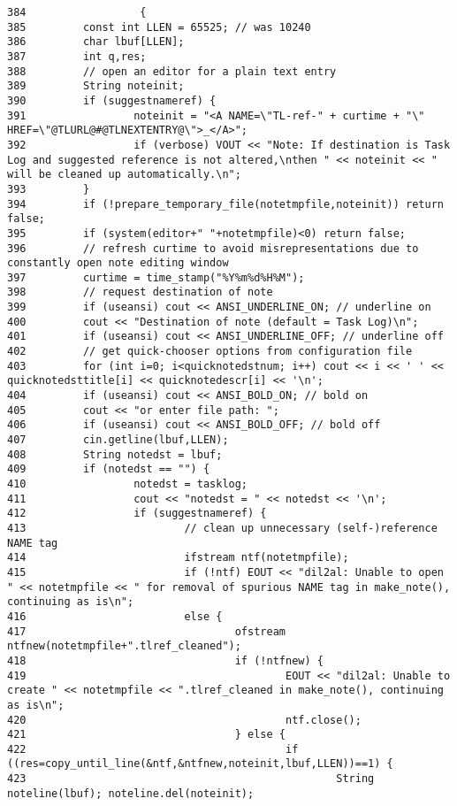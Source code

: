 \footnotesize\begin{verbatim}384                  {
385         const int LLEN = 65525; // was 10240
386         char lbuf[LLEN];
387         int q,res;
388         // open an editor for a plain text entry
389         String noteinit;
390         if (suggestnameref) {
391                 noteinit = "<A NAME=\"TL-ref-" + curtime + "\" HREF=\"@TLURL@#@TLNEXTENTRY@\">_</A>";
392                 if (verbose) VOUT << "Note: If destination is Task Log and suggested reference is not altered,\nthen " << noteinit << " will be cleaned up automatically.\n";
393         }
394         if (!prepare_temporary_file(notetmpfile,noteinit)) return false;
395         if (system(editor+" "+notetmpfile)<0) return false;
396         // refresh curtime to avoid misrepresentations due to constantly open note editing window
397         curtime = time_stamp("%Y%m%d%H%M");
398         // request destination of note
399         if (useansi) cout << ANSI_UNDERLINE_ON; // underline on
400         cout << "Destination of note (default = Task Log)\n";
401         if (useansi) cout << ANSI_UNDERLINE_OFF; // underline off
402         // get quick-chooser options from configuration file
403         for (int i=0; i<quicknotedstnum; i++) cout << i << ' ' << quicknotedsttitle[i] << quicknotedescr[i] << '\n';
404         if (useansi) cout << ANSI_BOLD_ON; // bold on
405         cout << "or enter file path: ";
406         if (useansi) cout << ANSI_BOLD_OFF; // bold off
407         cin.getline(lbuf,LLEN);
408         String notedst = lbuf;
409         if (notedst == "") {
410                 notedst = tasklog;
411                 cout << "notedst = " << notedst << '\n';
412                 if (suggestnameref) {
413                         // clean up unnecessary (self-)reference NAME tag
414                         ifstream ntf(notetmpfile);
415                         if (!ntf) EOUT << "dil2al: Unable to open " << notetmpfile << " for removal of spurious NAME tag in make_note(), continuing as is\n";
416                         else {
417                                 ofstream ntfnew(notetmpfile+".tlref_cleaned");
418                                 if (!ntfnew) {
419                                         EOUT << "dil2al: Unable to create " << notetmpfile << ".tlref_cleaned in make_note(), continuing as is\n";
420                                         ntf.close();
421                                 } else {
422                                         if ((res=copy_until_line(&ntf,&ntfnew,noteinit,lbuf,LLEN))==1) {
423                                                 String noteline(lbuf); noteline.del(noteinit);

\end{verbatim}
